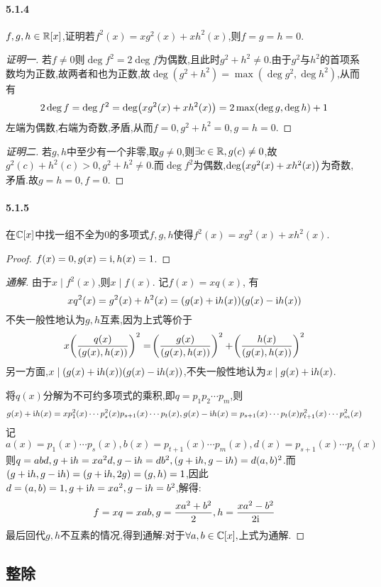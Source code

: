 \documentclass[11pt]{article}
\begin{document}
\paragraph{5.1.4}$f,g,h\in \mathbb{R}[x]$,证明若$f^2(x)=xg^2(x)+xh^2(x)$,则$f=g=h=0$.
\begin{proof}[证明一]
    若$f\neq 0$则$\deg f^2=2\deg f$为偶数,且此时$g^2+h^2\neq 0$.由于$g^2$与$h^2$的首项系数均为正数,故两者和也为正数,故$\deg(g^2+h^2)=\max(\deg g^2,\deg h^2)$,从而有
    $$2\deg f=\deg f^2=\deg\!\left(xg^2(x)+xh^2(x)\right)=2\max(\deg g,\deg h)+1$$
    左端为偶数,右端为奇数,矛盾,从而$f=0,g^2+h^2=0,g=h=0$.
\end{proof}
\begin{proof}[证明二]
    若$g,h$中至少有一个非零,取$g\neq 0$,则$\exists c\in\mathbb{R}, g(c)\neq 0$,故$g^2(c)+h^2(c)>0, g^2+h^2\neq 0$.而$\deg f^2$为偶数,$\deg\!\left(xg^2(x)+xh^2(x)\right)$为奇数,矛盾.故$g=h=0,f=0$.
\end{proof}
\paragraph{5.1.5}在$\mathbb{C}[x]$中找一组不全为0的多项式$f,g,h$使得$f^2(x)=xg^2(x)+xh^2(x)$.
\begin{proof}
    $f(x)=0, g(x)=\mathrm{i}, h(x)=1$.
\end{proof}
\begin{proof}[通解]
    由于$x\mid f^2(x)$,则$x\mid f(x)$. 记$f(x)=xq(x)$, 有
    $$xq^2(x)=g^2(x)+h^2(x)=(g(x)+\mathrm{i} h(x))(g(x)-\mathrm{i} h(x))$$
    不失一般性地认为$g,h$互素,因为上式等价于
    $$x\!\left(\frac{q(x)}{(g(x),h(x))}\right)^2=\!\left(\frac{g(x)}{(g(x),h(x))}\right)^2+\!\left(\frac{h(x)}{(g(x),h(x))}\right)^2$$
    另一方面,$x\mid (g(x)+\mathrm{i} h(x))(g(x)-\mathrm{i} h(x))$,不失一般性地认为$x\mid g(x)+\mathrm{i} h(x)$.
    
    将$q(x)$分解为不可约多项式的乘积,即$q=p_1p_2\cdots p_m$,则
    $$g(x)+\mathrm{i} h(x)=xp_1^2(x)\cdots p_{s}^2(x) p_{s+1}(x)\cdots p_{t}(x), g(x)-\mathrm{i} h(x)=p_{s+1}(x)\cdots p_{t}(x)p_{t+1}^2(x)\cdots p_{m}^2(x)$$
    记
    $$a(x)=p_1(x)\cdots p_{s}(x), b(x)=p_{t+1}(x)\cdots p_{m}(x), d(x)=p_{s+1}(x)\cdots p_{t}(x)$$
    则$q=abd, g+\mathrm{i} h=x a^2d, g-\mathrm{i} h=db^2, (g+\mathrm{i} h, g-\mathrm{i} h)=d(a,b)^2$.而
    $(g+\mathrm{i} h, g-\mathrm{i} h)=(g+\mathrm{i} h, 2g)=(g,h)=1$,因此$d=(a,b)=1, g+\mathrm{i} h=x a^2, g-\mathrm{i} h=b^2$,解得:
    $$f=xq=xab, g=\frac{x a^2+b^2}{2}, h=\frac{x a^2-b^2}{2\mathrm{i}}$$
    最后回代$g,h$不互素的情况,得到通解:对于$\forall a,b\in \mathbb{C}[x],$上式为通解.
\end{proof}

\subsection{整除}
\end{document}
